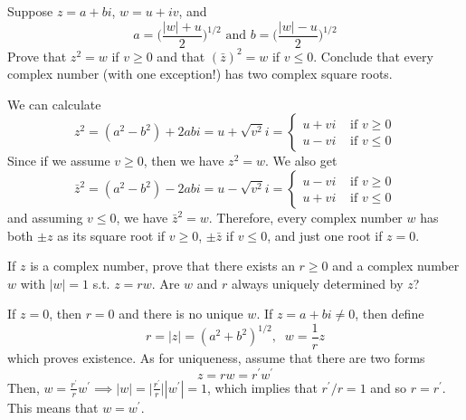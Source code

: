 \documentclass{article}
\begin{document}
    \begin{exercise}[Rudin 1.10]
    Suppose $z = a + bi$, $w = u + iv$, and 
    \[a = \bigg( \frac{|w| + u}{2} \bigg)^{1/2} \text{ and } b = \bigg( \frac{|w| - u}{2} \bigg)^{1/2}\]
    Prove that $z^2 = w$ if $v \geq 0$ and that $(\bar{z})^2 = w$ if $v \leq 0$. Conclude that every complex number (with one exception!) has two complex square roots. 
    \end{exercise}
    \begin{solution}
    We can calculate 
    \[z^2 = (a^2 - b^2) + 2 a b i = u + \sqrt{v^2} i = \begin{cases} u + v i & \text{ if } v \geq 0 \\ u - vi & \text{ if } v \leq 0 \end{cases} \]
    Since if we assume $v \geq 0$, then we have $z^2 = w$. We also get 
    \[\bar{z}^2 = (a^2 - b^2) - 2 a b i = u - \sqrt{v^2} i = \begin{cases} u - v i & \text{ if } v \geq 0 \\ u + vi & \text{ if } v \leq 0 \end{cases} \]
    and assuming $v \leq 0$, we have $\bar{z}^2 = w$. Therefore, every complex number $w$ has both $\pm z$ as its square root if $v \geq 0$, $\pm \bar{z}$ if $v \leq 0$, and just one root if $z = 0$. 
    \end{solution}

    \begin{exercise}[Rudin 1.11]
    If $z$ is a complex number, prove that there exists an $r \geq 0$ and a complex number $w$ with $|w| = 1$ s.t. $z = rw$. Are $w$ and $r$ always uniquely determined by $z$? 
    \end{exercise}
    \begin{solution}
    If $z = 0$, then $r = 0$ and there is no unique $w$. If $z = a + bi \neq 0$, then define 
    \[r = |z| = (a^2 + b^2)^{1/2}, \;\; w = \frac{1}{r} z\]
    which proves existence. As for uniqueness, assume that there are two forms 
    \[z = r w = r^\prime w^\prime\]
    Then, $w = \frac{r^\prime}{r} w^\prime \implies |w| = \big| \frac{r^\prime}{r} \big| |w^\prime| = 1$, which implies that $r^\prime / r = 1$ and so $r = r^\prime$. This means that $w = w^\prime$. 
    \end{solution}
\end{document}

